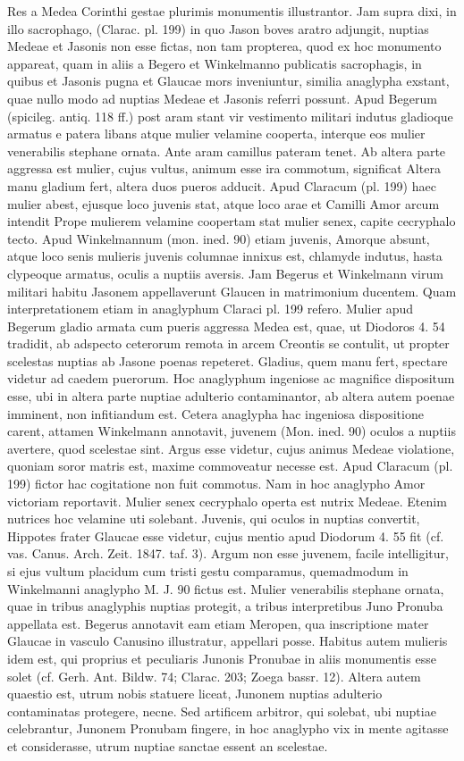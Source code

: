 \documentclass[landscape, a4paper, 11pt, oneside, polutonikogreek, german]{article}
\begin{document}
Res a Medea Corinthi gestae plurimis monumentis illustrantor. Jam supra dixi, in illo sacrophago, (Clarac. pl. 199) in quo Jason boves aratro adjungit, nuptias Medeae et Jasonis non esse fictas, non tam propterea, quod ex hoc monumento appareat, quam in aliis a Begero et Winkelmanno publicatis sacrophagis, in quibus et Jasonis pugna et Glaucae mors inveniuntur, similia anaglypha exstant, quae nullo modo ad nuptias Medeae et Jasonis referri possunt. Apud Begerum (spicileg. antiq. 118 ff.) post aram stant vir vestimento militari indutus gladioque armatus e patera libans atque mulier velamine cooperta, interque eos mulier venerabilis stephane ornata. Ante aram camillus pateram tenet. Ab altera parte aggressa est mulier, cujus vultus, animum esse ira commotum, significat Altera manu gladium fert, altera duos pueros adducit. Apud Claracum (pl. 199) haec mulier abest, ejusque loco juvenis stat, atque loco arae et Camilli Amor arcum intendit Prope mulierem velamine coopertam stat mulier senex, capite cecryphalo tecto. Apud Winkelmannum (mon. ined. 90) etiam juvenis, Amorque absunt, atque loco senis mulieris juvenis columnae innixus est, chlamyde indutus, hasta clypeoque armatus, oculis a nuptiis aversis. Jam Begerus et Winkelmann virum militari habitu Jasonem appellaverunt Glaucen in matrimonium ducentem. Quam interpretationem etiam in anaglyphum Claraci pl. 199 refero. Mulier apud Begerum gladio armata cum pueris aggressa Medea est, quae, ut Diodoros 4. 54 tradidit, ab adspecto ceterorum remota in arcem Creontis se contulit, ut propter scelestas nuptias ab Jasone poenas repeteret. Gladius, quem manu fert, spectare videtur ad caedem puerorum. Hoc anaglyphum ingeniose ac magnifice dispositum esse, ubi in altera parte nuptiae adulterio contaminantor, ab altera autem poenae imminent, non infitiandum est. Cetera anaglypha hac ingeniosa dispositione carent, attamen Winkelmann annotavit, juvenem (Mon. ined. 90) oculos a nuptiis avertere, quod scelestae sint. Argus esse videtur, cujus animus Medeae violatione, quoniam soror matris est, maxime commoveatur necesse est. Apud Claracum (pl. 199) fictor hac cogitatione non fuit commotus. Nam in hoc anaglypho Amor victoriam reportavit. Mulier senex cecryphalo operta est nutrix Medeae. Etenim nutrices hoc velamine uti solebant. Juvenis, qui oculos in nuptias convertit, Hippotes frater Glaucae esse videtur, cujus mentio apud Diodorum 4. 55 fit (cf. vas. Canus. Arch. Zeit. 1847. taf. 3). Argum non esse juvenem, facile intelligitur, si ejus vultum placidum cum tristi gestu comparamus, quemadmodum in Winkelmanni anaglypho M. J. 90 fictus est. Mulier venerabilis stephane ornata, quae in tribus anaglyphis nuptias protegit, a tribus interpretibus Juno Pronuba appellata est. Begerus annotavit eam etiam Meropen, qua inscriptione mater Glaucae in vasculo Canusino illustratur, appellari posse. Habitus autem mulieris idem est, qui proprius et peculiaris Junonis Pronubae in aliis monumentis esse solet (cf. Gerh. Ant. Bildw. 74; Clarac. 203; Zoega bassr. 12). Altera autem quaestio est, utrum nobis statuere liceat, Junonem nuptias adulterio contaminatas protegere, necne. Sed artificem arbitror, qui solebat, ubi nuptiae celebrantur, Junonem Pronubam fingere, in hoc anaglypho vix in mente agitasse et considerasse, utrum nuptiae sanctae essent an scelestae.
\end{document}
